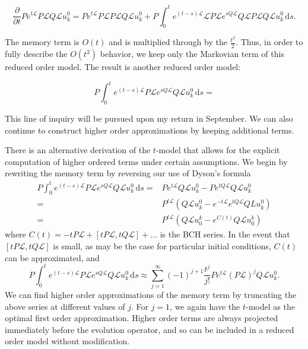 \documentclass{article}
\begin{document}
\begin{equation}
\frac{\partial}{\partial t} Pe^{t\mathcal{L}}P\mathcal{L}Q\mathcal{L}u_k^0 = Pe^{t\mathcal{L}}P\mathcal{L}P\mathcal{L}Q\mathcal{L}u_k^0+P\int_0^t e^{(t-s)\mathcal{L}}\mathcal{L}P\mathcal{L}e^{sQ\mathcal{L}}Q\mathcal{L}P\mathcal{L}Q\mathcal{L}u_k^0\,\mathrm{d}s.
\end{equation}

The memory term is $O(t)$ and is multiplied through by the $\frac{t^2}{2}$. Thus, in order to fully describe the $O(t^2)$ behavior, we keep only the Markovian term of this reduced order model. The result is another reduced order model:

\begin{equation}
P\int_0^te^{(t-s)\mathcal{L}}P\mathcal{L}e^{sQ\mathcal{L}}Q\mathcal{L}u_k^0\,\mathrm{d}s=\label{t2model}
\end{equation}

 This line of inquiry will be pursued upon my return in September. We can also continue to construct higher order approximations by keeping additional terms.

There is an alternative derivation of the $t$-model that allows for the explicit computation of higher ordered terms under certain assumptions. We begin by rewriting the memory term by reversing our use of Dyson's formula
\begin{align*}
P\int_0^te^{(t-s)\mathcal{L}}P\mathcal{L}e^{sQ\mathcal{L}}Q\mathcal{L}u_k^0\,\mathrm{d}s=&Pe^{t\mathcal{L}}Q\mathcal{L}u_k^0-Pe^{tQ\mathcal{L}}Q\mathcal{L}u_k^0\\
=&P^{t\mathcal{L}}\left(Q\mathcal{L}u_k^0-e^{-t\mathcal{L}}e^{tQ\mathcal{L}}QLu_k^0\right)\\
=&P^{t\mathcal{L}}\left(Q\mathcal{L}u_0^k -e^{C(t)}Q\mathcal{L}u_0^k\right)
\end{align*}where $C(t) = -tP\mathcal{L}+[tP\mathcal{L},tQ\mathcal{L}]+\dots$ is the BCH series. In the event that $[tP\mathcal{L},tQ\mathcal{L}]$ is small, as may be the case for particular initial conditions, $C(t)$ can be approximated, and
\begin{equation}
P\int_0^te^{(t-s)\mathcal{L}}P\mathcal{L}e^{sQ\mathcal{L}}Q\mathcal{L}u_k^0\,\mathrm{d}s\approx \sum_{j=1}^\infty (-1)^{j+1}\frac{t^j}{j!}Pe^{t\mathcal{L}}(P\mathcal{L})^jQ\mathcal{L}u_k^0.\label{t model again}
\end{equation}We can find higher order approximations of the memory term by truncating the above series at different values of $j$. For $j=1$, we again have the $t$-model as the optimal first order approximation. Higher order terms are always projected immediately before the evolution operator, and so can be included in a reduced order model without modification.
\end{document}
